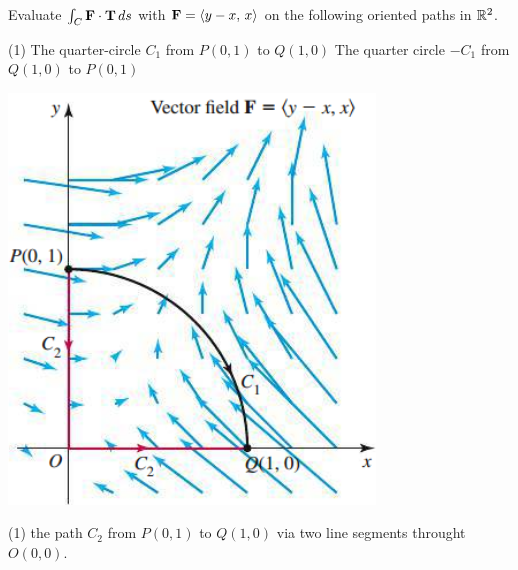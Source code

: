 \documentclass[mathNotesPreamble]{subfiles}
\begin{document}
  \begin{ex*}
    Evaluate $\int_C \mathbf F\cdot{\mathbf{T}}\,ds$ with $\mathbf F={\left\langle y-x,\,x \right\rangle}$ on the following oriented paths in $\mathbb{R}^2$.
  \end{ex*}
  \vspace*{-\baselineskip}
  \noindent
  \begin{minipage}[t]{0.6\linewidth}\mbox{}
    \begin{tasks}[after-item-skip=8\baselineskip, label=\alph*)](1)
      \task 
        The quarter-circle $C_1$ from $P(0,1)$ to $Q(1,0)$
      \task 
        The quarter circle $-C_1$ from $Q(1,0)$ to $P(0,1)$
    \end{tasks}
  \end{minipage}
  \begin{minipage}[t]{0.4\linewidth}\mbox{}
    \begin{flushright}
      \includegraphics[width=0.75\linewidth]{images/briggs_17_02/fig17_20}
    \end{flushright}
  \end{minipage}

  \begin{tasks}[after-item-skip=\stretch{1}, label=\alph*), resume](1)
    \task 
      the path $C_2$ from $P(0,1)$ to $Q(1,0)$ via two line segments throught $O(0,0)$.
  \end{tasks}
  \pagebreak
\end{document}
